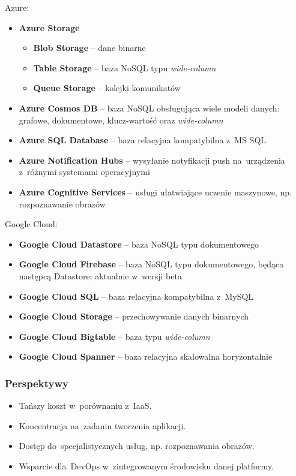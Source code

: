 \documentclass[12pt,a4paper,twoside,titlepage,openright]{book}
\begin{document}
\noindent
Azure:
\begin{itemize}
\item \textbf{Azure Storage}
	\begin{itemize}
		\item \textbf{Blob Storage} -- dane binarne
		\item \textbf{Table Storage} -- baza NoSQL typu \textit{wide-column}
		\item \textbf{Queue Storage} -- kolejki komunikatów
	\end{itemize}
\item \textbf{Azure Cosmos DB} -- baza NoSQL obsługująca wiele modeli danych: grafowe, dokumentowe, klucz-wartość oraz \textit{wide-column}
\item \textbf{Azure SQL Database} -- baza relacyjna kompatybilna z~MS SQL
\item \textbf{Azure Notification Hubs} -- wysyłanie notyfikacji push na~urządzenia z~różnymi systemami operacyjnymi
\item \textbf{Azure Cognitive Services} -- usługi ułatwiające uczenie maszynowe, np. rozpoznawanie obrazów

\end{itemize}

\noindent
Google Cloud:
\begin{itemize}
\item \textbf{Google Cloud Datastore} -- baza NoSQL typu dokumentowego
\item \textbf{Google Cloud Firebase} -- baza NoSQL typu dokumentowego, będąca następcą Datastore; aktualnie w~wersji beta
\item \textbf{Google Cloud SQL} -- baza relacyjna kompatybilna z~MySQL
\item \textbf{Google Cloud Storage} -- przechowywanie danych binarnych
\item \textbf{Google Cloud Bigtable} -- baza typu \textit{wide-column}
\item \textbf{Google Cloud Spanner} -- baza relacyjna skalowalna horyzontalnie

\end{itemize}

\subsubsection{Perspektywy}
\begin{itemize}
\item Tańszy koszt w~porównaniu z~IaaS.
\item Koncentracja na~zadaniu tworzenia aplikacji.
\item Dostęp do~specjalistycznych usług, np. rozpoznawania obrazów.
\item Wsparcie dla~DevOps w~zintegrowanym środowisku danej platformy.
\end{itemize}
\end{document}
